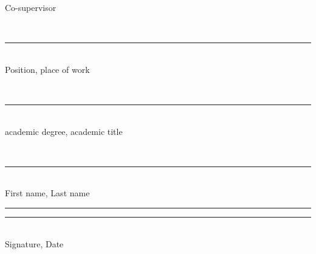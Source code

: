\begin{titlepage}
\ifhseHasCoSupervisor
\vspace{0.35cm}

\noindent
\begin{minipage}[t]{0.42\textwidth}
\raggedright
Co-supervisor

\vspace{0.18cm}
\strut\hseCoSupervisorTitle\\[-0.05cm]
\rule{6.1cm}{0.4pt}\\[-0.05cm]
{\scriptsize Position, place of work}

\vspace{0.08cm}
\strut\hseCoSupervisorDegree\\[-0.05cm]
\rule{6.1cm}{0.4pt}\\[-0.05cm]
{\scriptsize academic degree, academic title}

\vspace{0.08cm}
\strut\hseCoSupervisorName\\[-0.05cm]
\rule{6.1cm}{0.4pt}\\[-0.05cm]
{\scriptsize First name, Last name}

\vspace{0.08cm}
\rule{3.6cm}{0.4pt}\quad\rule{2.2cm}{0.4pt}\\[-0.05cm]
{\scriptsize Signature, Date}
\end{minipage}
\hfill
\begin{minipage}[t]{0.42\textwidth}
\strut
\end{minipage}
\fi

\vfill

\begin{center}
\textbf{\hseCityEn{} \hseYear}
\end{center}
\end{titlepage}


\setcounter{page}{2}
\clearpage
